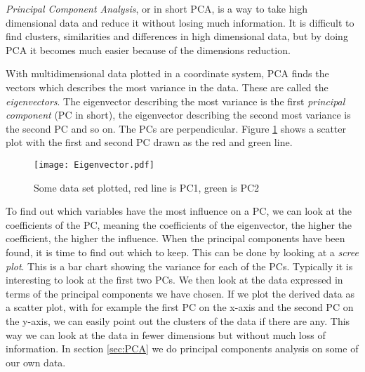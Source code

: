 \documentclass[Report.tex]{subfiles}
\begin{document}
\emph{Principal Component Analysis}, or in short PCA, is a way to take high dimensional data and reduce it without losing much information. It is difficult to find clusters, similarities and differences in high dimensional data, but by doing PCA it becomes much easier because of the dimensions reduction. \cite{PCAtheory}

With multidimensional data plotted in a coordinate system, PCA finds the vectors which describes the most variance in the data. These are called the \emph{eigenvectors}. The eigenvector describing the most variance is the first \emph{principal component} (PC in short), the eigenvector describing the second most variance is the second PC and so on. The PCs are perpendicular. Figure \ref{fig:eigen} shows a scatter plot with the first and second PC drawn as the red and green line.
\begin{figure}
\center
\texttt{[image: Eigenvector.pdf]}
\caption{Some data set plotted, red line is PC1, green is PC2}
\label{fig:eigen}
\end{figure}

To find out which variables have the most influence on a PC, we can look at the coefficients of the PC, meaning the coefficients of the eigenvector, the higher the coefficient, the higher the influence. 
When the principal components have been found, it is time to find out which to keep. This can be done by looking at a \emph{scree plot}. This is a bar chart showing the variance for each of the PCs. Typically it is interesting to look at the first two PCs. We then look at the data expressed in terms of the principal components we have chosen. If we plot the derived data as a scatter plot, with for example the first PC on the x-axis and the second PC on the y-axis, we can easily point out the clusters of the data if there are any. This way we can look at the data in fewer dimensions but without much loss of information. In section \ref{sec:PCA} we do principal components analysis on some of our own data.
\end{document}
